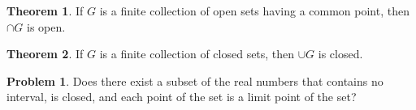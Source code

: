 \documentclass{article}
\theoremstyle{definition}
\newtheorem{theorem}{Theorem}
\theoremstyle{definition}
\newtheorem{problem}{Problem}
\theoremstyle{plain}
\begin{document}
\begin{theorem}
  If $G$ is a finite collection of open sets having a common point, then $\cap
  G$ is open.
\end{theorem}

\begin{theorem}
  If $G$ is a finite collection of closed sets, then $\cup G$ is closed.
\end{theorem}

\begin{problem}
  Does there exist a subset of the real numbers that contains no interval, is
  closed, and each point of the set is a limit point of the set?
\end{problem}
\end{document}
